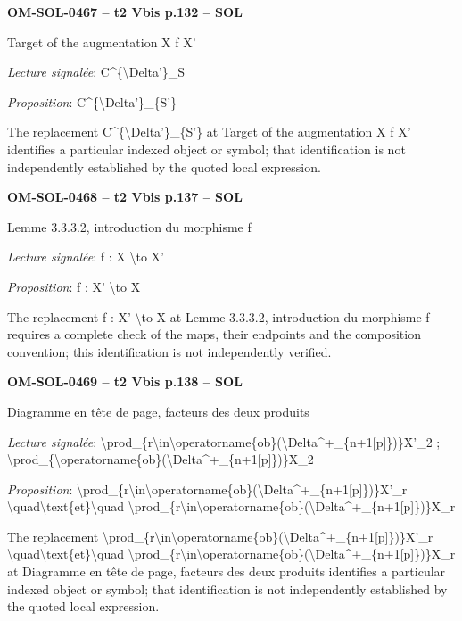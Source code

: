 \par\noindent\textbf{OM-SOL-0467 -- t2 Vbis p.132 -- SOL}\par
Target of the augmentation X f X'\par
\emph{Lecture signalée}: C\textasciicircum{}\{\textbackslash{}Delta'\}\_S\par
\emph{Proposition}: C\textasciicircum{}\{\textbackslash{}Delta'\}\_\{S'\}\par
The replacement C\textasciicircum{}\{\textbackslash{}Delta'\}\_\{S'\} at Target of the augmentation X f X' identifies a particular indexed object or symbol; that identification is not independently established by the quoted local expression.\par
\par\noindent\textbf{OM-SOL-0468 -- t2 Vbis p.137 -- SOL}\par
Lemme 3.3.3.2, introduction du morphisme f\par
\emph{Lecture signalée}: f : X \textbackslash{}to X'\par
\emph{Proposition}: f : X' \textbackslash{}to X\par
The replacement f : X' \textbackslash{}to X at Lemme 3.3.3.2, introduction du morphisme f requires a complete check of the maps, their endpoints and the composition convention; this identification is not independently verified.\par
\par\noindent\textbf{OM-SOL-0469 -- t2 Vbis p.138 -- SOL}\par
Diagramme en tête de page, facteurs des deux produits\par
\emph{Lecture signalée}: \textbackslash{}prod\_\{r\textbackslash{}in\textbackslash{}operatorname\{ob\}(\textbackslash{}Delta\textasciicircum{}+\_\{n+1[p]\})\}X'\_2 ; \textbackslash{}prod\_\{\textbackslash{}operatorname\{ob\}(\textbackslash{}Delta\textasciicircum{}+\_\{n+1[p]\})\}X\_2\par
\emph{Proposition}: \textbackslash{}prod\_\{r\textbackslash{}in\textbackslash{}operatorname\{ob\}(\textbackslash{}Delta\textasciicircum{}+\_\{n+1[p]\})\}X'\_r \textbackslash{}quad\textbackslash{}text\{et\}\textbackslash{}quad \textbackslash{}prod\_\{r\textbackslash{}in\textbackslash{}operatorname\{ob\}(\textbackslash{}Delta\textasciicircum{}+\_\{n+1[p]\})\}X\_r\par
The replacement \textbackslash{}prod\_\{r\textbackslash{}in\textbackslash{}operatorname\{ob\}(\textbackslash{}Delta\textasciicircum{}+\_\{n+1[p]\})\}X'\_r \textbackslash{}quad\textbackslash{}text\{et\}\textbackslash{}quad \textbackslash{}prod\_\{r\textbackslash{}in\textbackslash{}operatorname\{ob\}(\textbackslash{}Delta\textasciicircum{}+\_\{n+1[p]\})\}X\_r at Diagramme en tête de page, facteurs des deux produits identifies a particular indexed object or symbol; that identification is not independently established by the quoted local expression.\par
